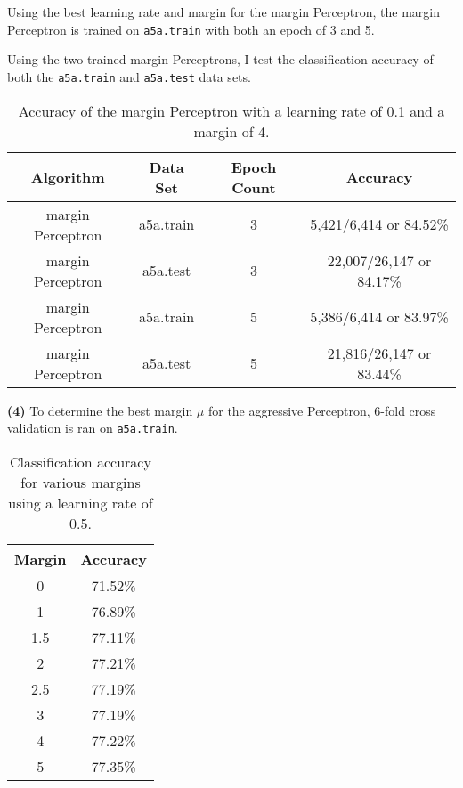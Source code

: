 \documentclass[11pt]{article}
\renewcommand\part[1]{\vspace{.10in}\textbf{(#1)}}
\begin{document}
Using the best learning rate and margin for the margin Perceptron, the margin Perceptron is trained on \texttt{a5a.train} with both an epoch of 3 and 5. \newline


 \newline

Using the two trained margin Perceptrons, I test the classification accuracy of both the \texttt{a5a.train} and \texttt{a5a.test} data sets.

\begin{table}[H]
\centering
{\renewcommand{\arraystretch}{1.2}%
\begin{tabular}{| c | c | c | c |}
\hline
Algorithm& Data Set & Epoch Count & Accuracy\\
\hline
margin Perceptron & a5a.train & 3 & 5,421/6,414 or 84.52\%\\ \hline
margin Perceptron & a5a.test & 3 & 22,007/26,147 or 84.17\%\\ \hline
margin Perceptron & a5a.train & 5 & 5,386/6,414 or 83.97\%\\ \hline
margin Perceptron & a5a.test & 5 & 21,816/26,147 or 83.44\%\\ \hline
\end{tabular}}
\caption{Accuracy of the margin Perceptron with a learning rate of 0.1 and a margin of 4.}
\end{table}

\part{4} To determine the best margin $\mu$ for the aggressive Perceptron, 6-fold cross validation is ran on \texttt{a5a.train}.

\begin{table}[H]
\centering
{\renewcommand{\arraystretch}{1.2}%
\begin{tabular}{| c | c |}
\hline
Margin & Accuracy\\
\hline
0 & 71.52\%\\ \hline
1 & 76.89\%\\ \hline
1.5 & 77.11\%\\ \hline
2 & 77.21\%\\ \hline
2.5 & 77.19\%\\ \hline
3 & 77.19\%\\ \hline
4 & 77.22\%\\ \hline
5 & 77.35\%\\ \hline
\end{tabular}}
\caption{Classification accuracy for various margins using a learning rate of 0.5.}
\end{table}
\end{document}
